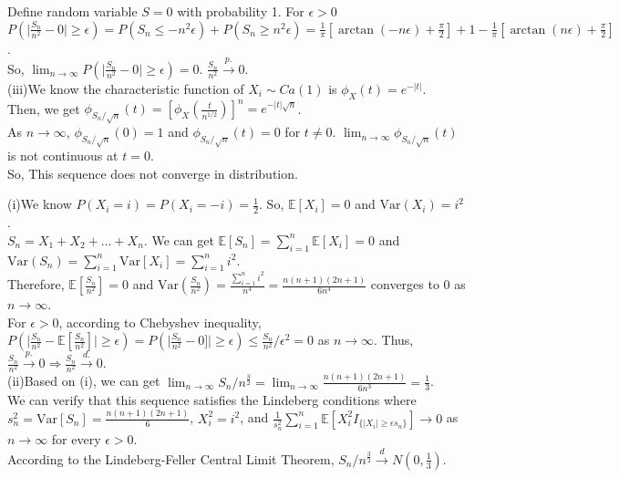 \documentclass{homework}
\begin{document}
Define random variable $S=0$ with probability 1. For $\epsilon > 0$\\
$P(\mid \frac{S_n}{n^2} - 0\mid \geq \epsilon) 
= P(S_n \leq -n^2\epsilon) + P(S_n \geq n^2\epsilon)
= \frac{1}{\pi}[\arctan(-n\epsilon)+\frac{\pi}{2}]+1-\frac{1}{\pi}[\arctan(n\epsilon)+\frac{\pi}{2}]$.\\
So, $\lim_{n \to \infty}P(\mid \frac{S_n}{n^2} - 0\mid \geq \epsilon) = 0$. $\frac{S_{n}}{n^{2}} \stackrel{p.}{\rightarrow} 0$.\\

(iii)We know the characteristic function of $X_i \sim Ca(1)$ is $\phi_{X}(t)=e^{-|t|}$.\\
 Then, we get $\phi_{{S_n}/{\sqrt{n}}}(t)=\left[\phi_{X}\left(\frac{t}{n^{1/2}}\right)\right]^{n}=e^{-|t|\sqrt{n}}$.\\
 As $n \to \infty$,  $\phi_{{S_n}/{\sqrt{n}}}(0)=1$ and $\phi_{{S_n}/{\sqrt{n}}}(t)=0$ for $t \neq 0$. $\lim_{n \to \infty} \phi_{{S_n}/{\sqrt{n}}}(t)$ is not continuous at $t=0$.\\
 So, This sequence does not converge in distribution.

\question %
(i)We know $P(X_i=i)=P(X_i=-i)=\frac{1}{2}$. So, $\mathbb{E}[X_i] = 0$ and $\text{Var}(X_i) = i^2$.\\   
$S_n = X_1+X_2+\ldots+X_n$. We can get $\mathbb{E}[S_n] = \sum_{i=1}^{n}\mathbb{E}[X_i] = 0$ and $\text{Var}(S_n) = \sum_{i=1}^{n} \text{Var}[X_i] = \sum_{i=1}^{n}i^2$.\\
Therefore, $\mathbb{E}[\frac{S_n}{n^2}]=0$ and 
$\text{Var}(\frac{S_n}{n^2}) = \frac{\sum_{i=1}^{n}i^2}{n^4} = \frac{n(n+1)(2n+1)}{6n^4}$ converges to 0 as $n \to \infty$.\\
For $\epsilon > 0$, according to Chebyshev inequality,  \\
$P(\mid \frac{S_n}{n^2} - \mathbb{E}[\frac{S_n}{n^2}]\mid \geq \epsilon) = P(\mid \frac{S_n}{n^2} - 0]\mid \geq \epsilon)\leq \frac{S_n}{n^2}/\epsilon^2 = 0$ as $n \to \infty$.
Thus, $\frac{S_{n}}{n^{2}} \stackrel{p.}{\rightarrow} 0 \Rightarrow \frac{S_{n}}{n^{2}} \stackrel{d.}{\rightarrow} 0$.\\

(ii)Based on (i), we can get $\lim_{n \to \infty}S_n/n^\frac{3}{2} = \lim_{n \to \infty} \frac{n(n+1)(2n+1)}{6n^3} = \frac{1}{3}$.\\
We can verify that this sequence satisfies the Lindeberg conditions 
where $s_n^2 = \text{Var}[S_n] = \frac{n(n+1)(2n+1)}{6}$, $X_i^2 = i^2$, and $\frac{1}{s_n^2}\sum_{i=1}^{n}\mathbb{E}[X_i^2I_{\{\mid X_i\mid \geq \epsilon s_n\}}] \to 0$ as $n \to \infty$ for every $\epsilon >0$.\\
According to the Lindeberg-Feller Central Limit Theorem, $S_{n} / n^{\frac{3}{2}} \stackrel{d}{\rightarrow} N\left(0, \frac{1}{3}\right)$.\\
\end{document}
